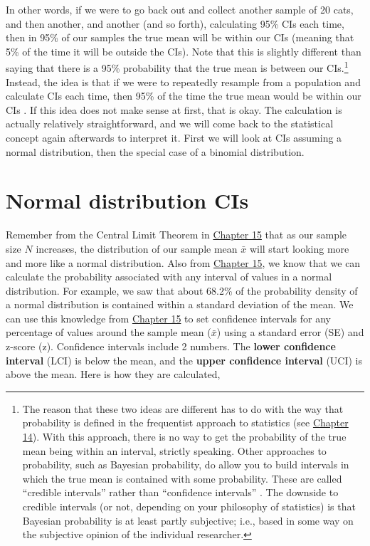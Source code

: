 \documentclass[
]{scrbook}
\begin{document}
In other words, if we were to go back out and collect another sample of 20 cats, and then another, and another (and so forth), calculating 95\% CIs each time, then in 95\% of our samples the true mean will be within our CIs (meaning that 5\% of the time it will be outside the CIs).
Note that this is slightly different than saying that there is a 95\% probability that the true mean is between our CIs.\footnote{The reason that these two ideas are different has to do with the way that probability is defined in the frequentist approach to statistics (see \protect\hyperlink{Chapter_14}{Chapter 14}). With this approach, there is no way to get the probability of the true mean being within an interval, strictly speaking. Other approaches to probability, such as Bayesian probability, do allow you to build intervals in which the true mean is contained with some probability. These are called ``credible intervals'' rather than ``confidence intervals'' \citep[e.g.,][]{Ellison2004}. The downside to credible intervals (or not, depending on your philosophy of statistics) is that Bayesian probability is at least partly subjective; i.e., based in some way on the subjective opinion of the individual researcher.}
Instead, the idea is that if we were to repeatedly resample from a population and calculate CIs each time, then 95\% of the time the true mean would be within our CIs \citep{Sokal1995}.
If this idea does not make sense at first, that is okay.
The calculation is actually relatively straightforward, and we will come back to the statistical concept again afterwards to interpret it.
First we will look at CIs assuming a normal distribution, then the special case of a binomial distribution.

\hypertarget{normal-distribution-cis}{%
\section{Normal distribution CIs}\label{normal-distribution-cis}}

Remember from the Central Limit Theorem in \protect\hyperlink{Chapter_15}{Chapter 15} that as our sample size \(N\) increases, the distribution of our sample mean \(\bar{x}\) will start looking more and more like a normal distribution.
Also from \protect\hyperlink{Chapter_15}{Chapter 15}, we know that we can calculate the probability associated with any interval of values in a normal distribution.
For example, we saw that about 68.2\% of the probability density of a normal distribution is contained within a standard deviation of the mean.
We can use this knowledge from \protect\hyperlink{Chapter_15}{Chapter 15} to set confidence intervals for any percentage of values around the sample mean (\(\bar{x}\)) using a standard error (SE) and z-score (z).
Confidence intervals include 2 numbers.
The \textbf{lower confidence interval} (LCI) is below the mean, and the \textbf{upper confidence interval} (UCI) is above the mean.
Here is how they are calculated,
\end{document}
